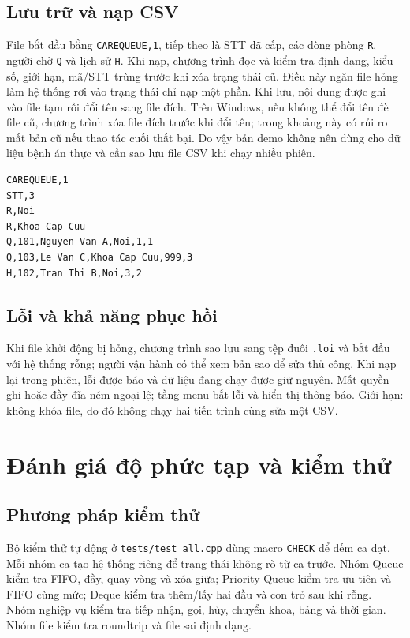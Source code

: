 \documentclass[12pt,a4paper,oneside]{report}
\begin{document}
\section{Lưu trữ và nạp CSV}
File bắt đầu bằng \texttt{CAREQUEUE,1}, tiếp theo là STT đã cấp, các dòng phòng \texttt{R}, người chờ \texttt{Q} và lịch sử \texttt{H}. Khi nạp, chương trình đọc và kiểm tra định dạng, kiểu số, giới hạn, mã/STT trùng trước khi xóa trạng thái cũ. Điều này ngăn file hỏng làm hệ thống rơi vào trạng thái chỉ nạp một phần. Khi lưu, nội dung được ghi vào file tạm rồi đổi tên sang file đích. Trên Windows, nếu không thể đổi tên đè file cũ, chương trình xóa file đích trước khi đổi tên; trong khoảng này có rủi ro mất bản cũ nếu thao tác cuối thất bại. Do vậy bản demo không nên dùng cho dữ liệu bệnh án thực và cần sao lưu file CSV khi chạy nhiều phiên.

\begin{lstlisting}[caption={Ví dụ định dạng lưu trạng thái}]
CAREQUEUE,1
STT,3
R,Noi
R,Khoa Cap Cuu
Q,101,Nguyen Van A,Noi,1,1
Q,103,Le Van C,Khoa Cap Cuu,999,3
H,102,Tran Thi B,Noi,3,2
\end{lstlisting}

\section{Lỗi và khả năng phục hồi}
Khi file khởi động bị hỏng, chương trình sao lưu sang tệp đuôi \texttt{.loi} và bắt đầu với hệ thống rỗng; người vận hành có thể xem bản sao để sửa thủ công. Khi nạp lại trong phiên, lỗi được báo và dữ liệu đang chạy được giữ nguyên. Mất quyền ghi hoặc đầy đĩa ném ngoại lệ; tầng menu bắt lỗi và hiển thị thông báo. Giới hạn: không khóa file, do đó không chạy hai tiến trình cùng sửa một CSV.

\chapter{Đánh giá độ phức tạp và kiểm thử}
\section{Phương pháp kiểm thử}
Bộ kiểm thử tự động ở \texttt{tests/test\_all.cpp} dùng macro \texttt{CHECK} để đếm ca đạt. Mỗi nhóm ca tạo hệ thống riêng để trạng thái không rò từ ca trước. Nhóm Queue kiểm tra FIFO, đầy, quay vòng và xóa giữa; Priority Queue kiểm tra ưu tiên và FIFO cùng mức; Deque kiểm tra thêm/lấy hai đầu và con trỏ sau khi rỗng. Nhóm nghiệp vụ kiểm tra tiếp nhận, gọi, hủy, chuyển khoa, bảng và thời gian. Nhóm file kiểm tra roundtrip và file sai định dạng.
\end{document}
